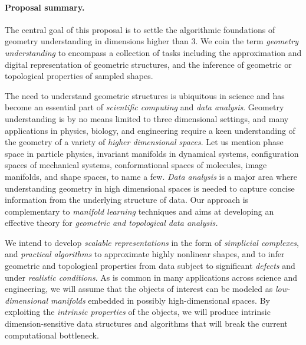 
\paragraph{Proposal summary.} 

The central goal of this proposal is to settle the algorithmic
foundations of geometry understanding in dimensions higher than 3.  We
coin the term {\em geometry understanding} to encompass a collection
of tasks including the approximation and digital representation
of geometric structures, and the inference of geometric or topological
properties of sampled
shapes.  

The need to understand geometric structures is ubiquitous in science
and has become an essential part of {\em scientific computing} and
{\em data analysis}. 
Geometry understanding is by no means limited to
three dimensional settings, and many applications in physics, biology, and
engineering require a keen understanding of the geometry of a variety
of {\em higher dimensional spaces}. Let us mention phase space in particle
physics, invariant manifolds in dynamical systems, configuration
spaces of mechanical systems, conformational spaces of molecules,
image manifolds, and shape spaces, to name a few.  {\em Data
  analysis} is a major area where understanding
geometry in high dimensional spaces is  needed to
 capture concise information from the underlying structure of
 data. Our approach is complementary to {\em manifold learning}
 techniques and aims at  developing an effective theory for {\em geometric and
 topological data analysis.}

We intend to develop {\em scalable representations} in the
form of {\em simplicial complexes}, and {\em practical algorithms} to
approximate highly nonlinear shapes, and to infer geometric and
topological properties from data subject to significant {\em defects}
and under {\em realistic conditions}.  As is common in many
applications across science and engineering, we will assume that the
objects of interest can be modeled as {\em low-dimensional manifolds}
embedded in possibly high-dimensional spaces. By exploiting the {\em
  intrinsic properties} of the objects, we will produce intrinsic
dimension-sensitive data structures and algorithms that will break the
current computational bottleneck.

